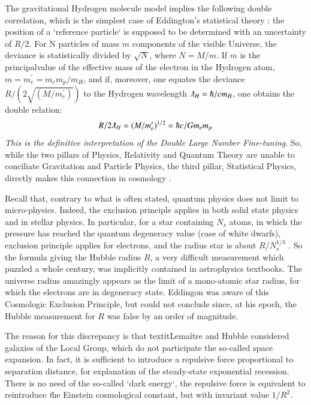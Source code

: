 \documentclass[twoside,draft]{article}
\begin{document}
\begin{sloppypar}
The gravitational Hydrogen molecule model \cite{Sanchez1} implies the following double correlation, which is the simplest case of Eddington's statistical theory \cite{Eddington}: the position of a `reference particle` is supposed to be determined 
with an uncertainty of ${R/2}$. 
For N particles of mass $m$ components of the visible Universe, the deviance is statistically divided by $\sqrt{N}$, where $N = M/m$. If $m$ is the principalvalue of the effective mass of the electron in the Hydrogen atom, $ m = m^{\prime}_{e} = m_{e} m_p/m_H $, and if, moreover, one equates the deviance $R/(2\sqrt{(M/m^{\prime}_{e})})$ to the Hydrogen wavelength $\lambdabar_{H} = \hbar/c m_{H}$, one obtains the double relation:
\begin{equation}
R/2\lambdabar_{H} = (M/m^{\prime}_{e})^{1/2} = \hbar c/G m_{e} m_{p}
\end{equation}
\textit{This is the definitive interpretation of the Double Large Number Fine-tuning}. 
So, while the two pillars of Physics, Relativity and Quantum Theory are unable to conciliate Gravitation 
and Particle Physics, the third pillar, Statistical Physics, directly makes this connection in cosmology \cite{Eddington}.

Recall that, contrary to what is often stated, quantum physics does not limit to micro-physics. Indeed, the exclusion principle applies in both solid state physics and in stellar physics. In particular, for a star containing $N_s$ atoms, in which the pressure has reached the quantum degeneracy value (case of white dwarfs), exclusion principle applies for electrons, and the radius star is about $R/N_{s}^{1/3}$ \cite{Sanchez1}. So the formula giving the Hubble radius $R$, a very difficult measurement which puzzled a whole century, was implicitly contained in astrophysics textbooks. 
The universe radius amazingly appears as the limit of a mono-atomic star radius, for which the electrons are in degeneracy state. Eddingon was aware of this Cosmologic Exclusion Principle, but could not conclude since, at his epoch, the Hubble measurement for $R$ was false by an order of magnitude.

The reason for this discrepancy is that textit{Lema\^itre and Hubble considered galaxies of the Local Group, which do not participate the so-called space expansion}. In fact, it is sufficient to introduce a repulsive force proportional to separation distance, for explanation of the steady-state exponential recession. There is no need of the so-called `dark energy`, the repulsive force is equivalent to reintroduce \textit the {Einstein cosmological constant, but with invariant value} $1/R^{2}$. 


\end{sloppypar}
\end{document}
